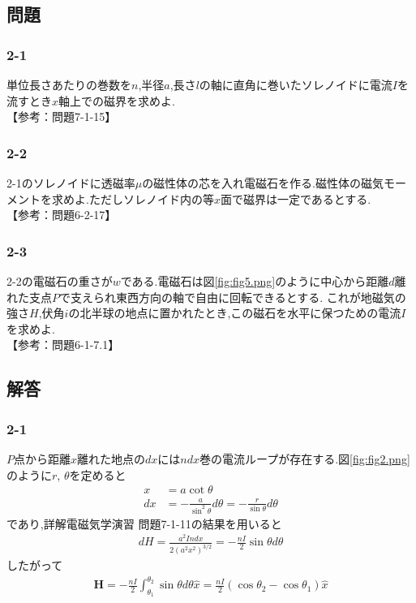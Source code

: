 \subsection*{問題}
\subsubsection*{2-1}
単位長さあたりの巻数を$n$,半径$a$,長さ$l$の軸に直角に巻いたソレノイドに電流$I$を流すとき$x$軸上での磁界を求めよ.\\
【参考：問題7-1-15】
\subsubsection*{2-2}
2-1のソレノイドに透磁率$\mu$の磁性体の芯を入れ電磁石を作る.磁性体の磁気モーメントを求めよ.ただしソレノイド内の等$x$面で磁界は一定であるとする.\\
【参考：問題6-2-17】
\subsubsection*{2-3}
2-2の電磁石の重さが$w$である.電磁石は図\ref{fig:fig5.png}のように中心から距離$d$離れた支点$P$で支えられ東西方向の軸で自由に回転できるとする.
これが地磁気の強さ$H$,伏角$i$の北半球の地点に置かれたとき,この磁石を水平に保つための電流$I$を求めよ.\\
【参考：問題6-1-7.1】
\subsection*{解答}
\subsubsection*{2-1}
$P$点から距離$x$離れた地点の$dx$には$ndx$巻の電流ループが存在する.図\ref{fig:fig2.png}のように$r$, $\theta$を定めると
\begin{align*}
  x  & =a\cot\theta                                                 \\
  dx & =-\frac{a}{\sin^2\theta}d\theta=-\frac{r}{\sin\theta}d\theta
\end{align*}
であり,詳解電磁気学演習 問題7-1-11の結果を用いると
\begin{align*}
  dH=\frac{a^2Indx}{2(a^2x^2)^{3/2}}=-\frac{nI}{2}\sin\theta d\theta
\end{align*}
したがって
\begin{align*}
  {\bm H}=-\frac{nI}{2}\int^{\theta_2}_{\theta_1}\sin\theta d\theta\hat{x}=\frac{nI}{2}(\cos\theta_2-\cos\theta_1)\hat{x}
\end{align*}

